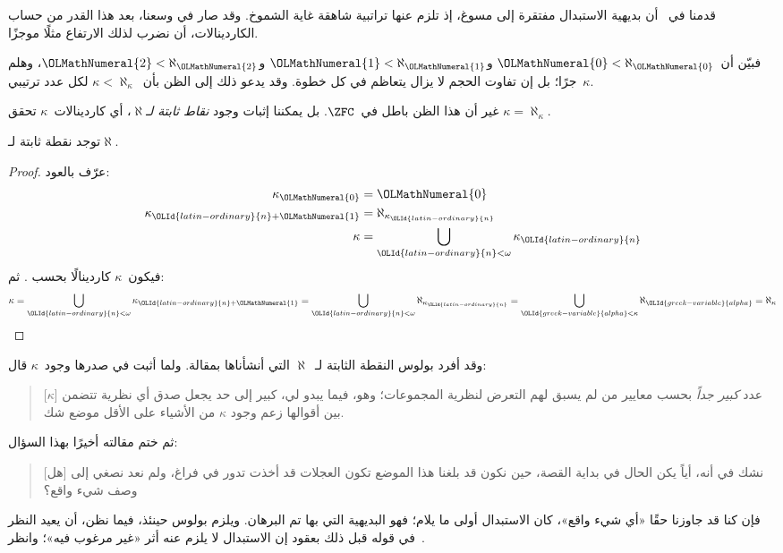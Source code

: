 \documentclass[../../../include/open-logic-section]{subfiles}
\begin{document}

قدمنا في~ أن بديهية الاستبدال مفتقرة إلى مسوغ،
إذ تلزم عنها تراتبية شاهقة غاية الشموخ. وقد صار في وسعنا، بعد هذا القدر
من حساب الكاردينالات، أن نضرب لذلك الارتفاع مثلًا موجزًا.

فبيّن أن~$\OLMathNumeral{0} < \aleph_\OLMathNumeral{0}$ و$\OLMathNumeral{1} < \aleph_\OLMathNumeral{1}$ و$\OLMathNumeral{2} < \aleph_\OLMathNumeral{2}$، وهلم
جرًا؛ بل إن تفاوت الحجم لا يزال يتعاظم في كل خطوة. وقد يدعو ذلك إلى
الظن بأن~$\kappa< \aleph_\kappa$ لكل عدد ترتيبي~$\kappa$.

غير أن هذا الظن باطل في~$\ZFC$. بل يمكننا إثبات وجود
\emph{نقاط ثابتة لـ$\aleph$}، أي كاردينالات~$\kappa$ تحقق
$\kappa=\aleph_\kappa$.

\begin{prop}
توجد نقطة ثابتة لـ$\aleph$.
\end{prop}

\begin{proof}
عرّف بالعود:
\begin{align*}
	\kappa_\OLMathNumeral{0} &= \OLMathNumeral{0}\\
	\kappa_{\OLId{latin-ordinary}{n}+\OLMathNumeral{1}} &= \aleph_{\kappa_\OLId{latin-ordinary}{n}}\\
	\kappa&= \bigcup_{\OLId{latin-ordinary}{n} < \omega}\kappa_\OLId{latin-ordinary}{n}
\end{align*}
فيكون~$\kappa$ كاردينالًا بحسب
. ثم:
\[
	\kappa= \bigcup_{\OLId{latin-ordinary}{n} < \omega} \kappa_{\OLId{latin-ordinary}{n}+\OLMathNumeral{1}} =
	\bigcup_{\OLId{latin-ordinary}{n} < \omega}\aleph_{\kappa_\OLId{latin-ordinary}{n}} =
	\bigcup_{\OLId{greek-variable}{alpha} < \kappa}\aleph_\OLId{greek-variable}{alpha} = \aleph_\kappa
\]
\end{proof}

وقد أفرد بولوس النقطة الثابتة لـ~$\aleph$ التي أنشأناها بمقالة. ولما
أثبت في صدرها وجود~$\kappa$ قال:
\begin{quote}
	[$\kappa$] عدد \emph{كبير جداً} بحسب معايير من لم يسبق لهم التعرض
	لنظرية المجموعات؛ وهو، فيما يبدو لي، كبير إلى حد يجعل صدق أي نظرية
	تتضمن بين أقوالها زعم وجود $\kappa$ من الأشياء على الأقل موضع شك.
	\citep[p.~257]{Boolos2000}
\end{quote}
ثم ختم مقالته أخيرًا بهذا السؤال:
\begin{quote}
	[هل] نشك في أنه، أياً يكن الحال في بداية القصة، حين نكون قد بلغنا هذا
	الموضع تكون العجلات قد أخذت تدور في فراغ، ولم نعد نصغي إلى وصف شيء
	واقع؟
	\citep[p.~268]{Boolos2000}
\end{quote}
فإن كنا قد جاوزنا حقًا «أي شيء واقع»، كان الاستبدال أولى ما يلام؛ فهو
البديهية التي بها تم البرهان. ويلزم بولوس حينئذ، فيما نظن، أن يعيد النظر
في قوله قبل ذلك بعقود إن الاستبدال لا يلزم عنه أثر «غير مرغوب فيه»؛
وانظر~.
\end{document}
